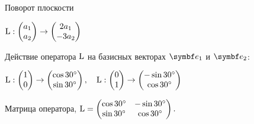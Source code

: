 \begin{frame}{Поворот плоскости}

$\operatorname{L} : \begin{pmatrix}
  a_1 \\
  a_2 \\
\end{pmatrix} \to 
\begin{pmatrix}
  2a_1 \\
  -3a_2 \\
\end{pmatrix}$

\pause

Действие оператора $\operatorname{L}$ на базисных векторах $\be_1$ и $\be_2$:

$\operatorname{L} : \begin{pmatrix}
  1 \\
  0 \\
\end{pmatrix} \to 
\begin{pmatrix}
\cos 30^{\circ}  \\
\sin 30^{\circ}  \\
\end{pmatrix}, \quad
\operatorname{L} : \begin{pmatrix}
  0 \\
  1 \\
\end{pmatrix} \to 
\begin{pmatrix}
 -\sin 30^{\circ}  \\
 \cos 30^{\circ} \\
\end{pmatrix}$

\pause

Матрица оператора, $\operatorname{L} = 
\begin{pmatrix}
  \cos 30^{\circ} & -\sin 30^{\circ}  \\
  \sin 30^{\circ} & \cos 30^{\circ} \\
\end{pmatrix}.$



\end{frame}
    


